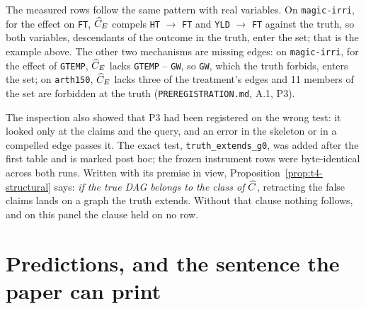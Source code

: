 The measured rows follow the same pattern with real variables. On \texttt{magic-irri}, for the effect
on \texttt{FT}, $\widehat{C}_E$ compels \texttt{HT} $\to$ \texttt{FT} and \texttt{YLD} $\to$ \texttt{FT}
against the truth, so both variables, descendants of the outcome in the truth, enter the set; that is
the example above. The other two mechanisms are missing edges: on \texttt{magic-irri}, for the effect
of \texttt{GTEMP}, $\widehat{C}_E$ lacks \texttt{GTEMP} -- \texttt{GW}, so \texttt{GW}, which the truth
forbids, enters the set; on \texttt{arth150}, $\widehat{C}_E$ lacks three of the treatment's edges and 11
members of the set are forbidden at the truth (\texttt{PREREGISTRATION.md}, A.1, P3).

The inspection also showed that P3 had been registered on the wrong test: it looked only at the claims
and the query, and an error in the skeleton or in a compelled edge passes it. The exact test,
\texttt{truth\_extends\_g0}, was added after the first table and is marked post hoc; the frozen
instrument rows were byte-identical across both runs. Written with its premise in view,
Proposition~\ref{prop:t4-structural} says: \emph{if the true DAG belongs to the class of $\widehat{C}$},
retracting the false claims lands on a graph the truth extends. Without that clause nothing follows,
and on this panel the clause held on no row.


\begin{antes}
\end{antes}

\section{Predictions, and the sentence the paper can print}

